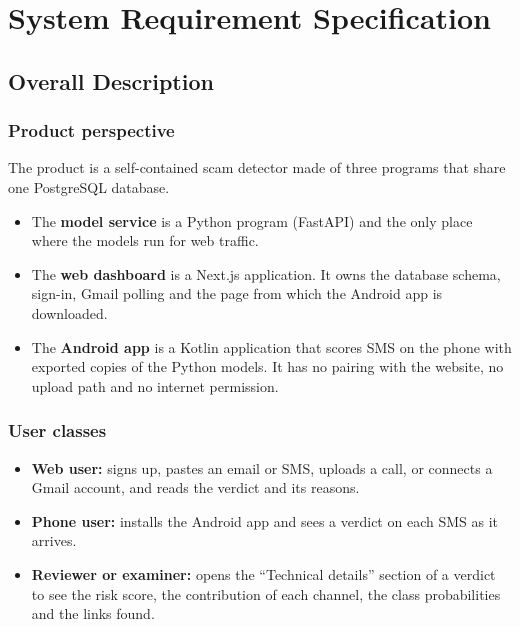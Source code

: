 \chapter{System Requirement Specification}\thispagestyle{thesisstyle} %
\graphicspath{{Chapter3/figures/}}
{

\section{Overall Description}

\subsection{Product perspective}
The product is a self-contained scam detector made of three programs that share one PostgreSQL database.
\begin{itemize}
\item The \textbf{model service} is a Python program (FastAPI) and the only place where the models run for web traffic.
\item The \textbf{web dashboard} is a Next.js application. It owns the database schema, sign-in, Gmail polling and the page from which the Android app is downloaded.
\item The \textbf{Android app} is a Kotlin application that scores SMS on the phone with exported copies of the Python models. It has no pairing with the website, no upload path and no internet permission.
\end{itemize}

\subsection{User classes}
\begin{itemize}
\item \textbf{Web user:} signs up, pastes an email or SMS, uploads a call, or connects a Gmail account, and reads the verdict and its reasons.
\item \textbf{Phone user:} installs the Android app and sees a verdict on each SMS as it arrives.
\item \textbf{Reviewer or examiner:} opens the ``Technical details'' section of a verdict to see the risk score, the contribution of each channel, the class probabilities and the links found.
\end{itemize}

}
